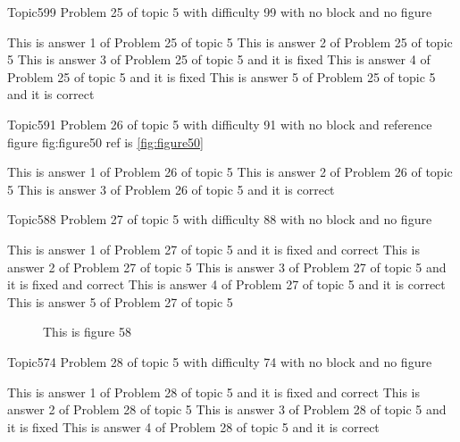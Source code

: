 \documentclass[master]{exam}
\begin{document}
\begin{problem}{Topic5}{99}
	Problem 25 of topic 5 with difficulty 99 with no block and no figure
	\begin{answers}
		\answer This is answer 1 of Problem 25 of topic 5 
		\answer This is answer 2 of Problem 25 of topic 5 
		\answer[fixed] This is answer 3 of Problem 25 of topic 5 and it is fixed
		\answer[fixed] This is answer 4 of Problem 25 of topic 5 and it is fixed
		\answer[correct] This is answer 5 of Problem 25 of topic 5 and it is correct
	\end{answers}
\end{problem}

\begin{problem}{Topic5}{91}
	Problem 26 of topic 5 with difficulty 91 with no block and reference figure fig:figure50 ref is \ref{fig:figure50}
	\begin{answers}
		\answer This is answer 1 of Problem 26 of topic 5 
		\answer This is answer 2 of Problem 26 of topic 5 
		\answer[correct] This is answer 3 of Problem 26 of topic 5 and it is correct
	\end{answers}
\end{problem}

\begin{problem}{Topic5}{88}
	Problem 27 of topic 5 with difficulty 88 with no block and no figure
	\begin{answers}
		 This is answer 1 of Problem 27 of topic 5 and it is fixed and correct
		\answer This is answer 2 of Problem 27 of topic 5 
		 This is answer 3 of Problem 27 of topic 5 and it is fixed and correct
		\answer[correct] This is answer 4 of Problem 27 of topic 5 and it is correct
		\answer This is answer 5 of Problem 27 of topic 5 
	\end{answers}
\end{problem}



\begin{figure}
	\begin{center}
		This is figure 58 
		\label{fig:figure58}
	\end{center}
\end{figure}

\begin{problem}{Topic5}{74}
	Problem 28 of topic 5 with difficulty 74 with no block and no figure
	\begin{answers}
		 This is answer 1 of Problem 28 of topic 5 and it is fixed and correct
		\answer This is answer 2 of Problem 28 of topic 5 
		\answer[fixed] This is answer 3 of Problem 28 of topic 5 and it is fixed
		\answer[correct] This is answer 4 of Problem 28 of topic 5 and it is correct
	\end{answers}
\end{problem}
\end{document}
